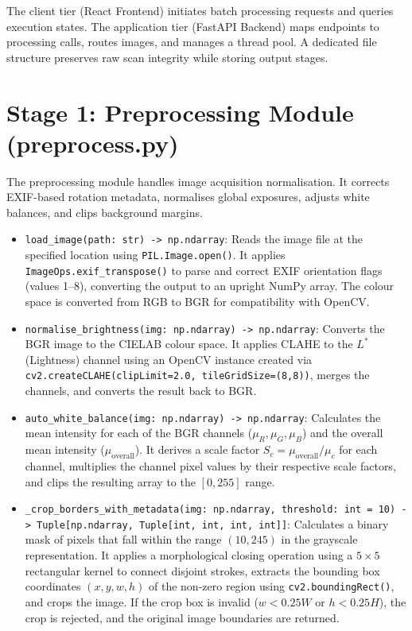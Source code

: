 The client tier (React Frontend) initiates batch processing requests and queries execution states. The application tier (FastAPI Backend) maps endpoints to processing calls, routes images, and manages a thread pool. A dedicated file structure preserves raw scan integrity while storing output stages.

\section{Stage 1: Preprocessing Module (preprocess.py)}

The preprocessing module handles image acquisition normalisation. It corrects EXIF-based rotation metadata, normalises global exposures, adjusts white balances, and clips background margins.

\begin{itemize}
	\item \texttt{load\_image(path: str) -> np.ndarray}:
	Reads the image file at the specified location using \texttt{PIL.Image.open()}. It applies \texttt{ImageOps.exif\_transpose()} to parse and correct EXIF orientation flags (values 1–8), converting the output to an upright NumPy array. The colour space is converted from RGB to BGR for compatibility with OpenCV.
	
	\item \texttt{normalise\_brightness(img: np.ndarray) -> np.ndarray}:
	Converts the BGR image to the CIELAB colour space. It applies CLAHE to the $L^*$ (Lightness) channel using an OpenCV instance created via \texttt{cv2.createCLAHE(clipLimit=2.0, tileGridSize=(8,8))}, merges the channels, and converts the result back to BGR.
	
	\item \texttt{auto\_white\_balance(img: np.ndarray) -> np.ndarray}:
	Calculates the mean intensity for each of the BGR channels ($\mu_R, \mu_G, \mu_B$) and the overall mean intensity ($\mu_{\text{overall}}$). It derives a scale factor $S_c = \mu_{\text{overall}} / \mu_c$ for each channel, multiplies the channel pixel values by their respective scale factors, and clips the resulting array to the $[0, 255]$ range.
	
	\item \texttt{\_crop\_borders\_with\_metadata(img: np.ndarray, threshold: int = 10) -> Tuple[np.ndarray, Tuple[int, int, int, int]]}:
	Calculates a binary mask of pixels that fall within the range $(10, 245)$ in the grayscale representation. It applies a morphological closing operation using a $5 \times 5$ rectangular kernel to connect disjoint strokes, extracts the bounding box coordinates $(x, y, w, h)$ of the non-zero region using \texttt{cv2.boundingRect()}, and crops the image. If the crop box is invalid ($w < 0.25 W$ or $h < 0.25 H$), the crop is rejected, and the original image boundaries are returned.
	

\end{itemize}
